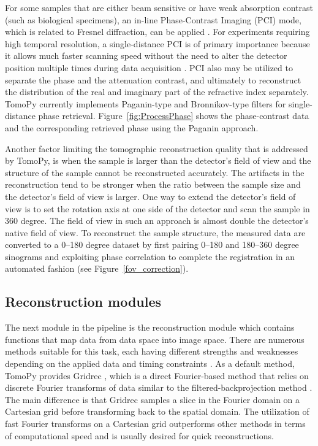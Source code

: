 \documentclass[pdf]{iucr}              %
\begin{document}
For some samples that are either beam sensitive or have weak absorption contrast (such as biological specimens), an in-line Phase-Contrast Imaging (PCI) mode, which is related to Fresnel diffraction, can be applied \cite{Davis1999}. For  experiments requiring high temporal resolution, a single-distance PCI is of primary importance because it allows much faster scanning speed without the need to alter the detector position multiple times during data acquisition \cite{Burvall:11}. PCI also may be utilized to separate the phase and the attenuation contrast, and ultimately to reconstruct the distribution of the real and imaginary part of the refractive index separately. TomoPy currently implements Paganin-type \cite{Paganin_2002} and Bronnikov-type \cite{Bronnikov1999} filters for single-distance phase retrieval. Figure~\ref{fig:ProcessPhase} shows the phase-contrast data and the corresponding retrieved phase using the Paganin approach.

Another factor limiting the tomographic reconstruction quality that is addressed by TomoPy, is when the sample is larger than the detector's field of view and the structure of the sample cannot be reconstructed accurately. The artifacts in the reconstruction tend to be stronger when the ratio between the sample size and the detector's field of view is larger. One way to extend the detector's field of view is to set the rotation axis at one side of the detector and scan the sample in 360 degree. The field of view in such an approach is almost double the detector's native field of view. To reconstruct the sample structure, the measured data are converted to a 0--180 degree dataset by first pairing 0--180 and 180--360 degree sinograms and exploiting phase correlation to complete the registration in an automated fashion (see Figure~\ref{fov_correction}). 

\subsection{Reconstruction modules}

The next module in the pipeline is the reconstruction module which contains functions that map data from data space into image space. There are numerous methods suitable for this task, each having different strengths and weaknesses depending on the applied data and timing constraints \cite{mirone2014pyhst2} \cite{rivers_spie_2012}. As a default method, TomoPy provides Gridrec \cite{dowd}, which is a direct Fourier-based method that relies on discrete Fourier transforms of data similar to the filtered-backprojection method \cite{kak_slaney}. The main difference is that Gridrec samples a slice in the Fourier domain on a Cartesian grid before transforming back to the spatial domain. The utilization of fast Fourier transforms on a Cartesian grid outperforms other methods in terms of computational speed and is usually desired for quick reconstructions.
\end{document}
